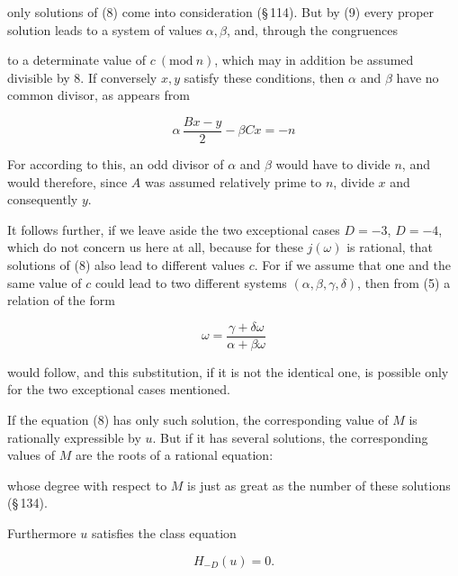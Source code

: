 
only  solutions of (8) come into consideration
(\S\,114). But by (9) every proper solution leads to a
system of values $\alpha, \beta$, and, through the congruences


to a determinate value of $c\ (\mathrm{mod}\ n)$, which may in addition be
assumed divisible by 8. If conversely $x, y$
satisfy these conditions, then $\alpha$ and $\beta$ have no common divisor, as appears from

\[ \alpha\,\dfrac{Bx-y}{2} - \beta Cx = -n \]

For according to this, an odd divisor of $\alpha$
and $\beta$ would have to divide $n$, and would therefore, since $A$ was
assumed relatively prime to $n$, divide $x$ and consequently $y$.

It follows further, if we leave aside the two exceptional cases
$D=-3$, $D=-4$, which do not concern us here at
all, because for these $j(\omega)$ is rational, that  solutions of (8) also lead to different values $c$.
For if we assume that one and the same value of $c$
could lead to two different systems $(\alpha, \beta, \gamma, \delta)$, then
from (5) a relation of the form

\[ \omega = \dfrac{\gamma+\delta\omega}{\alpha+\beta\omega} \]

would follow, and this substitution, if it is not the identical one,
is possible only for the two exceptional cases mentioned.


If the equation (8) has only  such solution, the
corresponding value of $M$ is rationally expressible by $u$. But if
it has several solutions, the corresponding values of $M$
are the roots of a rational equation:


whose degree with respect to $M$ is just as great as the number
of these solutions (\S\,134).

Furthermore $u$ satisfies the class equation

\[ H_{-D}(u) = 0. \]
